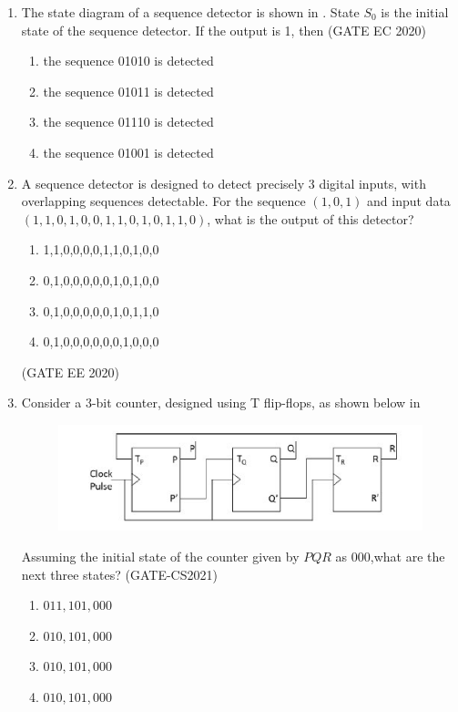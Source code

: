 \begin{enumerate}[label=\arabic*.,ref=\theenumi]
\item 	The state diagram of a sequence detector is shown in
  .
		 State $S_0$ is the initial state of the sequence detector. If the output is 1, then
\hfill (GATE EC 2020)
	\begin{figure}[H]
    \centering
    \resizebox{\columnwidth}{!}{%
  
		}
  \caption{}
  \label{fig:gate/ec/2020/39/1}		
  \end{figure}	 
\begin{enumerate}
 \item the sequence 01010 is detected
 \item the sequence 01011 is detected
 \item the sequence 01110 is detected
 \item the sequence 01001 is detected	 
\end{enumerate}	
\item A sequence detector is designed to detect precisely 3 digital inputs, with overlapping sequences detectable. For the sequence $(1,0,1)$ and input data $(1,1,0,1,0,0,1,1,0,1,0,1,1,0)$, what is the output of this detector?
		\begin{enumerate}
			\item 1,1,0,0,0,0,1,1,0,1,0,0
			\item 0,1,0,0,0,0,0,1,0,1,0,0
			\item 0,1,0,0,0,0,0,1,0,1,1,0
			\item 0,1,0,0,0,0,0,0,1,0,0,0
		\end{enumerate}
		\hfill (GATE EE 2020)
\item Consider a $3$-bit counter, designed using T flip-flops, as shown below
in 
     \begin{figure}[H]
\centering
\includegraphics[width=0.75\columnwidth]{ide/fsm/figs/3bitcounter.jpg}
\caption{}
\label{fig:3bitcounter.jpg}
\end{figure}
Assuming the initial state of the counter given by $PQR$ as $000$,what are the next three states?
                 \hfill(GATE-CS2021)
\begin{enumerate}[label=(\Alph*)]
\item $011, 101, 000$
\item $010, 101, 000$
\item $010, 101, 000$
\item $010, 101, 000$
\end{enumerate}


\end{enumerate}
